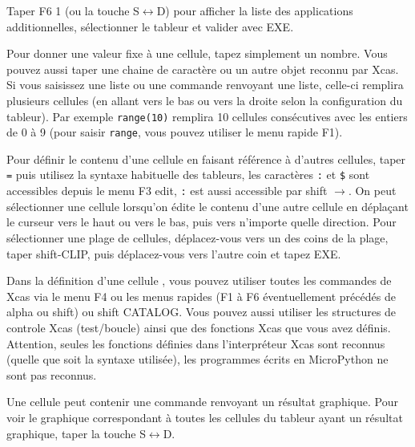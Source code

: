\documentclass{article}
\begin{document}
\begin{giacjshere}
Taper F6 1 (ou la touche S$\leftrightarrow$D) pour afficher la liste des
applications additionnelles, s\'electionner le tableur et valider avec
EXE. 

Pour donner une valeur fixe \`a une cellule, tapez simplement
un nombre. Vous pouvez aussi taper une chaine de caract\`ere
ou un autre objet reconnu par Xcas. Si vous saisissez une
liste ou une commande renvoyant une liste, celle-ci remplira
plusieurs cellules (en allant vers le bas ou vers la droite selon
la configuration du tableur). Par exemple \verb|range(10)|
remplira 10 cellules cons\'ecutives avec les entiers de 0 \`a 9
(pour saisir \verb|range|, vous pouvez utiliser le menu rapide F1).

Pour d\'efinir le contenu d'une cellule en faisant r\'ef\'erence
\`a d'autres cellules, taper \verb|=|
puis utilisez la syntaxe
habituelle des tableurs,  les
caract\`eres \verb|:| et \verb|$| sont accessibles depuis
le menu F3 edit, \verb|:| est aussi accessible par shift
$\rightarrow$. 
On peut s\'electionner une cellule lorsqu'on \'edite
le contenu d'une autre cellule en d\'epla\c{c}ant le curseur vers
le haut ou vers le bas, puis vers n'importe quelle direction.
Pour s\'electionner une plage de cellules, d\'eplacez-vous
vers un des coins de la plage, taper shift-CLIP, puis
d\'eplacez-vous vers l'autre coin et tapez EXE. 

Dans la d\'efinition d'une cellule ,
vous pouvez utiliser toutes les commandes de Xcas 
via le menu F4
ou les menus rapides (F1 \`a F6 \'eventuellement pr\'ec\'ed\'es
de alpha ou shift) ou shift CATALOG. Vous pouvez aussi utiliser les structures
de controle Xcas (test/boucle) ainsi que des fonctions
Xcas que vous avez d\'efinis. Attention, seules les fonctions
d\'efinies dans l'interpr\'eteur Xcas sont reconnus (quelle que soit
la syntaxe utilis\'ee), les programmes
\'ecrits en MicroPython ne sont pas reconnus.


Une cellule peut contenir une commande renvoyant un r\'esultat 
graphique. Pour voir le graphique correspondant \`a toutes les cellules du tableur ayant
un r\'esultat graphique, taper la touche S$\leftrightarrow$D.


\end{giacjshere}
\end{document}
